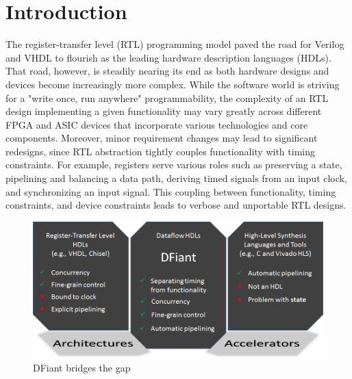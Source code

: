 \section{Introduction}
The register-transfer level (RTL) programming model paved the road for Verilog and VHDL to flourish as the leading hardware description languages (HDLs). That road, however, is steadily nearing its end as both hardware designs and devices become increasingly more complex. While the software world is striving for a "write once, run anywhere" programmability, the complexity of an RTL design implementing a given functionality may vary greatly across different FPGA and ASIC devices that incorporate various technologies and core components. Moreover, minor requirement changes may lead to significant redesigns, since RTL abstraction tightly couples functionality with timing constraints. For example, registers serve various roles such as preserving a state, pipelining and balancing a data path, deriving timed signals from an input clock, and synchronizing an input signal. This coupling between functionality, timing constraints, and device constraints leads to verbose and unportable RTL designs. 

\begin{figure}[h]
	\includegraphics[width=\linewidth]{graphics/teaser}
	\caption{DFiant bridges the gap}
	\label{fig:teaser}
\end{figure}

